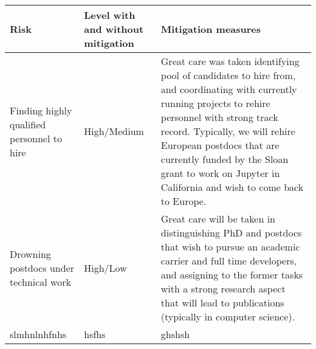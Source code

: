\noindent
\begin{center}
\begin{tabular}{|m{}|m{}|m{}|}\hline
  Risk & Level with and without mitigation & Mitigation measures\\\hline

  Finding highly qualified personnel to hire & High/Medium &
  Great care was taken identifying pool of candidates to hire from,
  and coordinating with currently running projects to rehire personnel
  with strong track record. Typically, we will rehire European
  postdocs that are currently funded by the Sloan grant to work on
  Jupyter in California and wish to come back to Europe.\\\hline

  Drowning postdocs under technical work & High/Low &
  Great care will be taken in distinguishing PhD and postdocs that
  wish to pursue an academic carrier and full time developers, and
  assigning to the former tasks with a strong research aspect that
  will lead to publications (typically in computer science).\\\hline

  slmhnlnhfnhs&hsfhs&ghshsh\\\hline
\end{tabular}
\end{center}





